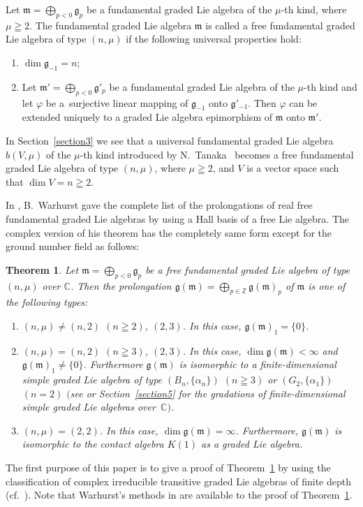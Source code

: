 \documentclass[pdftex]{sigma}
\numberwithin{equation}{section}
\numberwithin{theorem}{section}
\numberwithin{proposition}{section}
\numberwithin{lemma}{section}
\numberwithin{corollary}{section}
\numberwithin{definition}{section}
\numberwithin{example}{section}
\numberwithin{remark}{section}
\numberwithin{note}{section}
\newtheorem{theoremI}{Theorem}[]
\newcommand{\gla}[1]{\mathfrak#1=\bigoplus\limits_{p\in\mathbb Z}\mathfrak#1_p} \renewcommand{\labelenumi}{{\rm (\arabic{enumi})}}
\begin{document}
Let $\mathfrak m=\bigoplus\limits_{p<0}\mathfrak g_p$ be a fundamental graded Lie algebra of the $\mu$-th kind, where $\mu\geqq2$.
The fundamental graded Lie algebra
$\mathfrak m$ is called a free fundamental graded Lie algebra of type
$(n,\mu)$ if the following universal properties hold:
\begin{enumerate}\itemsep=0pt
\renewcommand{\labelenumi}{$(\roman{enumi})$}
\item $\dim \mathfrak g_{-1}=n$;
\item Let $\mathfrak m'=\bigoplus\limits_{p<0}\mathfrak g'_p$ be a fundamental
graded Lie algebra of the $\mu$-th kind and let $\varphi$ be a~surjective
linear mapping of $\mathfrak g_{-1}$ onto $\mathfrak g'_{-1}$.
Then $\varphi$ can be extended uniquely to a graded Lie algebra
epimorphism of $\mathfrak m$ onto $\mathfrak m'$.
\end{enumerate}
In Section~\ref{section3} we see that
a universal fundamental graded Lie algebra $b(V,\mu)$ of the $\mu$-th kind introduced
by N.~Tanaka~\cite{tan70:1} becomes
a free fundamental graded Lie algebra of type
$(n,\mu)$, where $\mu\geqq2$, and $V$ is a vector space such that
$\dim V=n\geqq2$.


In \cite{war07:1}, B.~Warhurst gave the complete list of the prolongations of
real free fundamental graded Lie algebras by using a Hall basis of a free Lie algebra.
The complex version of his theorem has the completely same form
except for the ground number f\/ield as follows:
\begin{theoremI}\label{Yatsui-theoremI}
Let $\mathfrak m=\bigoplus\limits_{p<0}\mathfrak g_p$ be a free
fundamental graded Lie algebra of type $(n,\mu)$ over $\mathbb C$.
Then
the prolongation $\gla{g (\mathfrak m)}$ of $\mathfrak m$ is
one of the following types:
\begin{enumerate}\itemsep=0pt
\renewcommand{\labelenumi}{$(\alph{enumi})$}
\item $(n,\mu)\ne(n,2)$ $(n\geqq2)$, $(2,3)$. In this case,
$\mathfrak g(\mathfrak m)_1=\{0\}$.
\item
$(n,\mu)=
(n,2)$ $(n\geqq3)$, $(2,3)$.
In this case, $\dim\mathfrak g(\mathfrak m)<\infty$ and
$\mathfrak g(\mathfrak m)_1\ne\{0\}$. Furthermore
$\mathfrak g(\mathfrak m)$ is isomorphic to a finite-dimensional simple graded
Lie algebra of type $(B_n,\{\alpha_n\})$ $(n\geqq3)$ or $(G_2,\{\alpha_1
\})$ $(n=2)$ $($see {\rm \cite{yam93:1}} or Section~{\rm \ref{section5}} for the gradations of
finite-dimensional simple graded Lie algebras over~$\mathbb C)$.
\item $(n,\mu)=(2,2)$.
In this case,
$\dim\mathfrak g(\mathfrak m)=\infty$. Furthermore,
$\mathfrak g(\mathfrak m)$ is isomorphic to the contact algebra
$K(1)$ as a graded Lie algebra.
\end{enumerate}
\end{theoremI}
The f\/irst purpose of this paper is to give a proof of Theorem~\ref{Yatsui-theoremI} by using the classif\/ication
of complex irreducible transitive graded Lie algebras of f\/inite depth
(cf.~\cite{mt70:1}).
Note that Warhurst's methods in \cite{war07:1} are available to the proof of Theorem~\ref{Yatsui-theoremI}.
\end{document}
